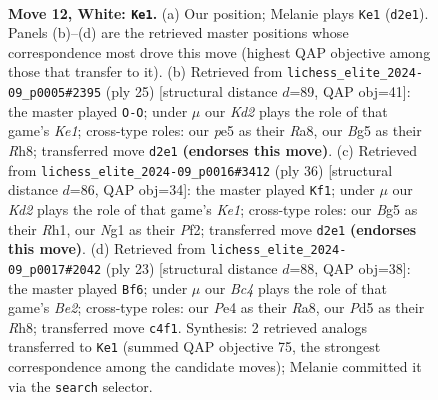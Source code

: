 \documentclass[11pt]{article}
\begin{document}
\clearpage

\begin{figure}[p]\centering
\begin{subfigure}{0.46\textwidth}\centering
\resizebox{\linewidth}{!}{%
\newchessgame
\chessboard[
  setfen={rnb1r1k1/pp3pbp/3q2p1/2pPp1B1/2B1P3/2P5/P2K1PPP/R1Q3NR w - - 0 12},
  showmover=false,
  pgfstyle=straightmove, color=movearrow, markmove={d2-e1}
]}
\caption{}
\end{subfigure}\hfill
\begin{subfigure}{0.46\textwidth}\centering
\resizebox{\linewidth}{!}{%
\newchessgame
\chessboard[
  setfen={r2qk2r/pb1pbppp/1p2p3/8/2PQP3/6P1/PP3PBP/R1B1R1K1 b kq - 0 13},
  showmover=false,
  pgfstyle=straightmove, color=movearrow, markmove={e8-g8}
]}
\caption{}
\end{subfigure}
\\[4pt]
\begin{subfigure}{0.46\textwidth}\centering
\resizebox{\linewidth}{!}{%
\newchessgame
\chessboard[
  setfen={r1b2rk1/p1q2pp1/4p3/3pP1NP/1bp2B2/2n1P3/P1B2P2/R1Q1K2R w KQ - 1 19},
  showmover=false,
  pgfstyle=straightmove, color=movearrow, markmove={e1-f1}
]}
\caption{}
\end{subfigure}\hfill
\begin{subfigure}{0.46\textwidth}\centering
\resizebox{\linewidth}{!}{%
\newchessgame
\chessboard[
  setfen={r1bqk2r/p3bp1p/2pp2p1/7n/2PQP2P/5PP1/PP3K2/RNB2B1R b kq - 0 12},
  showmover=false,
  pgfstyle=straightmove, color=movearrow, markmove={e7-f6}
]}
\caption{}
\end{subfigure}
\caption{\textbf{Move 12, White: \texttt{Ke1}.} (a) Our position; Melanie plays \texttt{Ke1} (\texttt{d2e1}). Panels (b)--(d) are the retrieved master positions whose correspondence most drove this move (highest QAP objective among those that transfer to it). (b) Retrieved from \texttt{lichess\_elite\_2024-09\_p0005\#2395} (ply 25) [structural distance $d$=89, QAP obj=41]: the master played \texttt{O-O}; under $\mu$ our \emph{Kd2} plays the role of that game's \emph{Ke1}; cross-type roles: our \emph{p}e5 as their \emph{R}a8, our \emph{B}g5 as their \emph{R}h8; transferred move \texttt{d2e1} \textbf{(endorses this move)}. (c) Retrieved from \texttt{lichess\_elite\_2024-09\_p0016\#3412} (ply 36) [structural distance $d$=86, QAP obj=34]: the master played \texttt{Kf1}; under $\mu$ our \emph{Kd2} plays the role of that game's \emph{Ke1}; cross-type roles: our \emph{B}g5 as their \emph{R}h1, our \emph{N}g1 as their \emph{P}f2; transferred move \texttt{d2e1} \textbf{(endorses this move)}. (d) Retrieved from \texttt{lichess\_elite\_2024-09\_p0017\#2042} (ply 23) [structural distance $d$=88, QAP obj=38]: the master played \texttt{Bf6}; under $\mu$ our \emph{Bc4} plays the role of that game's \emph{Be2}; cross-type roles: our \emph{P}e4 as their \emph{R}a8, our \emph{P}d5 as their \emph{R}h8; transferred move \texttt{c4f1}. Synthesis: 2 retrieved analogs transferred to \texttt{Ke1} (summed QAP objective 75, the strongest correspondence among the candidate moves); Melanie committed it via the \texttt{search} selector.}
\label{fig:thought-m22}
\end{figure}
\end{document}
